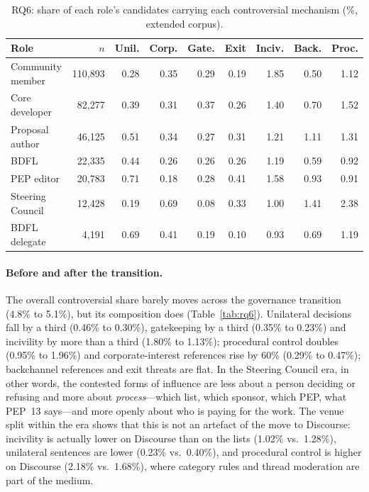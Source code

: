 \begin{table}[t]
\caption{RQ6: share of each role's candidates carrying each controversial mechanism (\%, extended corpus).}
\label{tab:rq6roles}
\footnotesize
\setlength{\tabcolsep}{3pt}
\begin{tabular}{lrrrrrrrr}
\toprule
Role & $n$ & Unil. & Corp. & Gate. & Exit & Inciv. & Back. & Proc. \\
\midrule
Community member & 110,893 & 0.28 & 0.35 & 0.29 & 0.19 & 1.85 & 0.50 & 1.12 \\
Core developer & 82,277 & 0.39 & 0.31 & 0.37 & 0.26 & 1.40 & 0.70 & 1.52 \\
Proposal author & 46,125 & 0.51 & 0.34 & 0.27 & 0.31 & 1.21 & 1.11 & 1.31 \\
BDFL & 22,335 & 0.44 & 0.26 & 0.26 & 0.26 & 1.19 & 0.59 & 0.92 \\
PEP editor & 20,783 & 0.71 & 0.18 & 0.28 & 0.41 & 1.58 & 0.93 & 0.91 \\
Steering Council & 12,428 & 0.19 & 0.69 & 0.08 & 0.33 & 1.00 & 1.41 & 2.38 \\
BDFL delegate & 4,191 & 0.69 & 0.41 & 0.19 & 0.10 & 0.93 & 0.69 & 1.19 \\
\bottomrule
\end{tabular}
\end{table}

\paragraph{Before and after the transition.} The overall controversial share barely moves across the governance transition (4.8\% to 5.1\%), but its composition does (Table~\ref{tab:rq6}). Unilateral decisions fall by a third (0.46\% to 0.30\%), gatekeeping by a third (0.35\% to 0.23\%) and incivility by more than a third (1.80\% to 1.13\%); procedural control doubles (0.95\% to 1.96\%) and corporate-interest references rise by 60\% (0.29\% to 0.47\%); backchannel references and exit threats are flat. In the Steering Council era, in other words, the contested forms of influence are less about a person deciding or refusing and more about \emph{process}---which list, which sponsor, which PEP, what PEP~13 says---and more openly about who is paying for the work. The venue split within the era shows that this is not an artefact of the move to Discourse: incivility is actually lower on Discourse than on the lists (1.02\% vs.\ 1.28\%), unilateral sentences are lower (0.23\% vs.\ 0.40\%), and procedural control is higher on Discourse (2.18\% vs.\ 1.68\%), where category rules and thread moderation are part of the medium.

